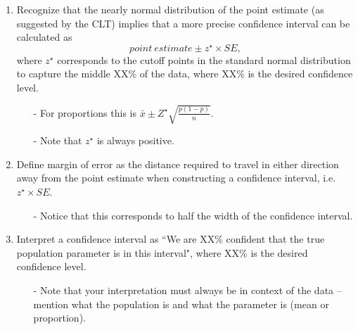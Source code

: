 \documentclass[11pt]{article}
\begin{document}
\begin{enumerate}[resume]
\item Recognize that the nearly normal distribution of the point estimate (as suggested by the CLT) implies that a more precise confidence interval can be calculated as
\[ point~estimate \pm z^{\star} \times SE, \] 
where $z^{\star}$ corresponds to the cutoff points in the standard normal distribution to capture the middle XX\% of the data, where XX\% is the desired confidence level.
\begin{itemize}
\item[-] For proportions this is $\bar{x} \pm Z^\star \sqrt{\frac{p(1-p)}{n}}$.
\item[-] Note that $z^{\star}$ is always positive.
\end{itemize}

\item Define margin of error as the distance required to travel in either direction away from the point estimate when constructing a confidence interval, i.e. $z^{\star} \times SE$.
\begin{itemize}
\item[-] Notice that this corresponds to half the width of the confidence interval.
\end{itemize}

\item Interpret a confidence interval as ``We are XX\% confident that the true population parameter is in this interval", where XX\% is the desired confidence level.
\begin{itemize}
\item[-] Note that your interpretation must always be in context of the data -- mention what the population is and what the parameter is (mean or proportion).
\end{itemize}


\end{enumerate}
\end{document}
